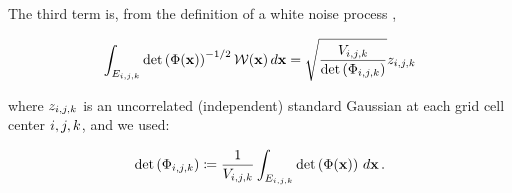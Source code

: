 The third term is, from the definition of a white noise process
\citep{adler_random_2007},
\begin{linenomath*}\begin{equation*}
    \int_{E_{i,j,k}}\text{det}\left(\Phi(\mathbf{x})\right)^{-1/2}\mathcal{W}(\mathbf{x}) \, d\mathbf{x}
        = \sqrt{\dfrac{V_{i,j,k}}{\text{det}\left(\Phi_{{i,j,k}}\right)}} z_{i,j,k}
\end{equation*}\end{linenomath*}
where $z_{i,j,k}$ is an uncorrelated (independent) standard Gaussian at each grid
cell center ${i,j,k}$, and we used:
\begin{linenomath*}\begin{equation*}
    \text{det}\left(\Phi_{{i,j,k}}\right) \coloneqq
    \dfrac{1}{V_{i,j,k}}\int_{E_{i,j,k}}\text{det}\left(\Phi(\mathbf{x})\right)\,d\mathbf{x}\,.
\end{equation*}\end{linenomath*}

